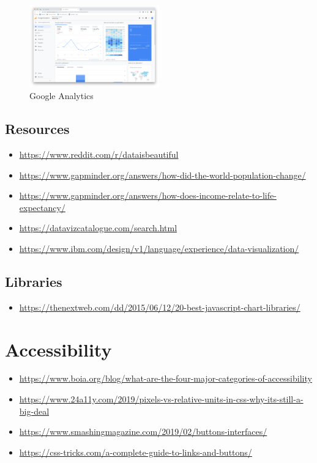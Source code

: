 \documentclass{article}
\begin{document}
\begin{figure}[H]
    \centering
    \includegraphics[width=0.5\textwidth]{dv-interactie1.png}
    \caption{Google Analytics}
\end{figure}

\subsection{Resources}

\begin{itemize}
    \item \url{https://www.reddit.com/r/dataisbeautiful}
    \item \url{https://www.gapminder.org/answers/how-did-the-world-population-change/}
    \item \url{https://www.gapminder.org/answers/how-does-income-relate-to-life-expectancy/}
    \item \url{https://datavizcatalogue.com/search.html}
    \item \url{https://www.ibm.com/design/v1/language/experience/data-visualization/}
\end{itemize}

\subsection{Libraries}

\begin{itemize}
    \item \url{https://thenextweb.com/dd/2015/06/12/20-best-javascript-chart-libraries/}
\end{itemize}

\section{Accessibility}

\begin{itemize}
    \item \url{https://www.boia.org/blog/what-are-the-four-major-categories-of-accessibility}
    \item \url{https://www.24a11y.com/2019/pixels-vs-relative-units-in-css-why-its-still-a-big-deal}
    \item \url{https://www.smashingmagazine.com/2019/02/buttons-interfaces/}
    \item \url{https://css-tricks.com/a-complete-guide-to-links-and-buttons/}
\end{itemize}
\end{document}

